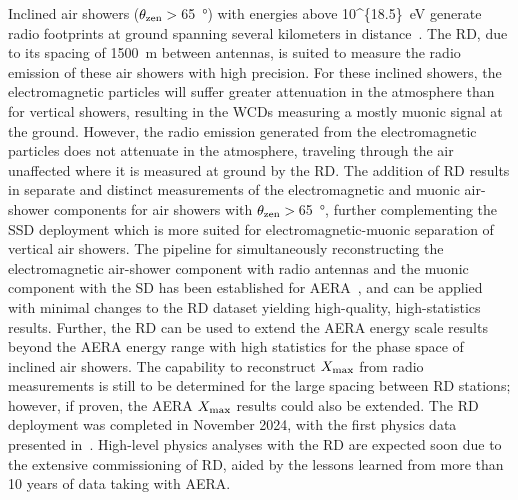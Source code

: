 Inclined air showers ($\theta_{\rm zen}>\,$\qty{65}{\degree}) with energies above \qty[parse-numbers=false]{10^{18.5}}{\electronvolt} generate radio footprints at ground spanning several kilometers in distance~\cite{auger_jcap2018_aerainclinedshowers}.
The RD, due to its spacing of \qty{1500}{\meter} between antennas, is suited to measure the radio emission of these air showers with high precision.
For these inclined showers, the electromagnetic particles will suffer greater attenuation in the atmosphere than for vertical showers, resulting in the WCDs measuring a mostly muonic signal at the ground.
However, the radio emission generated from the electromagnetic particles does not attenuate in the atmosphere, traveling through the air unaffected where it is measured at ground by the RD.
The addition of RD results in separate and distinct measurements of the electromagnetic and muonic air-shower components for air showers with $\theta_{\rm zen}>\,$\qty{65}{\degree}, further complementing the SSD deployment which is more suited for electromagnetic-muonic separation of vertical air showers.
The pipeline for simultaneously reconstructing the electromagnetic air-shower component with radio antennas and the muonic component with the SD has been established for AERA~\cite{auger_prd2025_aeramuoninclined}, and can be applied with minimal changes to the RD dataset yielding high-quality, high-statistics results.
Further, the RD can be used to extend the AERA energy scale results beyond the AERA energy range with high statistics for the phase space of inclined air showers.
The capability to reconstruct $X_{\rm max}$ from radio measurements is still to be determined for the large spacing between RD stations; however, if proven, the AERA $X_{\rm max}$ results could also be extended.
The RD deployment was completed in November 2024, with the first physics data presented in~\cite{auger_icrc2025_rdfirstdata}.
High-level physics analyses with the RD are expected soon due to the extensive commissioning of RD, aided by the lessons learned from more than 10 years of data taking with AERA.



